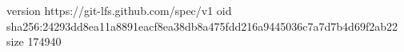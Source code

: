 version https://git-lfs.github.com/spec/v1
oid sha256:24293dd8ea11a8891eacf8ea38db8a475fdd216a9445036c7a7d7b4d69f2ab22
size 174940
